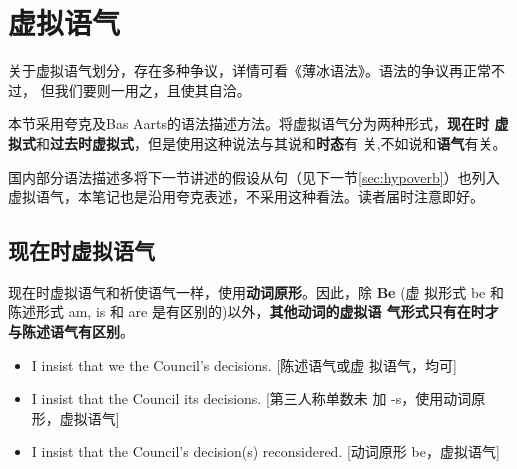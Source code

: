 \section{虚拟语气}

关于虚拟语气划分，存在多种争议，详情可看《薄冰语法》。语法的争议再正常不过，
但我们要则一用之，且使其自洽。

本节采用夸克及Bas Aarts的语法描述方法。将虚拟语气分为两种形式，\textbf{现在时
  虚拟式}和\textbf{过去时虚拟式}，但是使用这种说法与其说和\textbf{时态}有
关,不如说和\textbf{语气}有关。

国内部分语法描述多将下一节讲述的假设从句（见下一节\cref{sec:hypoverb}）也列入
虚拟语气，本笔记也是沿用夸克表述，不采用这种看法。读者届时注意即好。

\subsection{现在时虚拟语气}

现在时虚拟语气和祈使语气一样，使用\textbf{动词原形}。因此，除 \textbf{Be} (虚
拟形式 be 和陈述形式 am, is 和 are 是有区别的)以外，\textbf{其他动词的虚拟语
  气形式只有在}\textbf{时才与陈述语气有区别}。

\begin{itemize}
\item I insist that we  the Council's decisions. [陈述语气或虚
  拟语气，均可]
\item I insist that the Council  its decisions. [第三人称单数未
  加 -s，使用动词原形，虚拟语气]
\item I insist that the Council's decision(s)  reconsidered. [动词原形
  be，虚拟语气]
\end{itemize}

